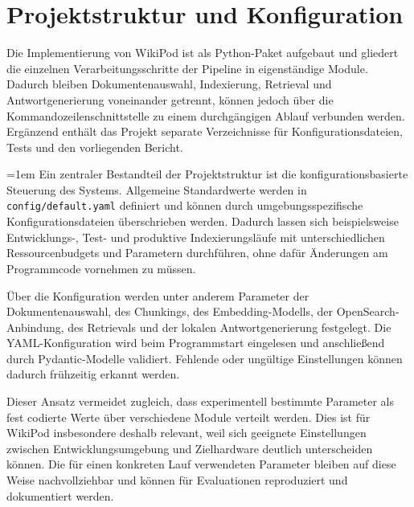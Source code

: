 \par\addvspace{1em}
\noindent\begin{minipage}[t]{\linewidth}
\vspace{0pt}
\section{Projektstruktur und Konfiguration}

Die Implementierung von WikiPod ist als Python-Paket aufgebaut und gliedert die
einzelnen Verarbeitungsschritte der Pipeline in eigenständige Module. Dadurch
bleiben Dokumentenauswahl, Indexierung, Retrieval und Antwortgenerierung
voneinander getrennt, können jedoch über die Kommandozeilenschnittstelle zu
einem durchgängigen Ablauf verbunden werden. Ergänzend enthält das Projekt
separate Verzeichnisse für Konfigurationsdateien, Tests und den vorliegenden
Bericht.

\begingroup
\emergencystretch=1em
Ein zentraler Bestandteil der Projektstruktur ist die konfigurationsbasierte
Steuerung des Systems. Allgemeine Standardwerte werden in
\texttt{config/\allowbreak{}default.\allowbreak{}yaml} definiert und können durch umgebungsspezifische
Konfigurationsdateien überschrieben werden. Dadurch lassen sich beispielsweise
Entwicklungs-, Test- und produktive Indexierungsläufe mit unterschiedlichen
Ressourcenbudgets und Parametern durchführen, ohne dafür Änderungen am
Programmcode vornehmen zu müssen.\par
\endgroup

Über die Konfiguration werden unter anderem Parameter der Dokumentenauswahl,
des Chunkings, des Embedding-Modells, der OpenSearch-Anbindung, des Retrievals
und der lokalen Antwortgenerierung festgelegt. Die YAML-Konfiguration wird beim
Programmstart eingelesen und anschließend durch Pydantic-Modelle validiert.
Fehlende oder ungültige Einstellungen können dadurch frühzeitig erkannt
werden.

Dieser Ansatz vermeidet zugleich, dass experimentell bestimmte Parameter als
fest codierte Werte über verschiedene Module verteilt werden. Dies ist für
WikiPod insbesondere deshalb relevant, weil sich geeignete Einstellungen
zwischen Entwicklungsumgebung und Zielhardware deutlich unterscheiden können.
Die für einen konkreten Lauf verwendeten Parameter bleiben auf diese Weise
nachvollziehbar und können für Evaluationen reproduziert und dokumentiert
werden.
\end{minipage}\par\addvspace{1em}
